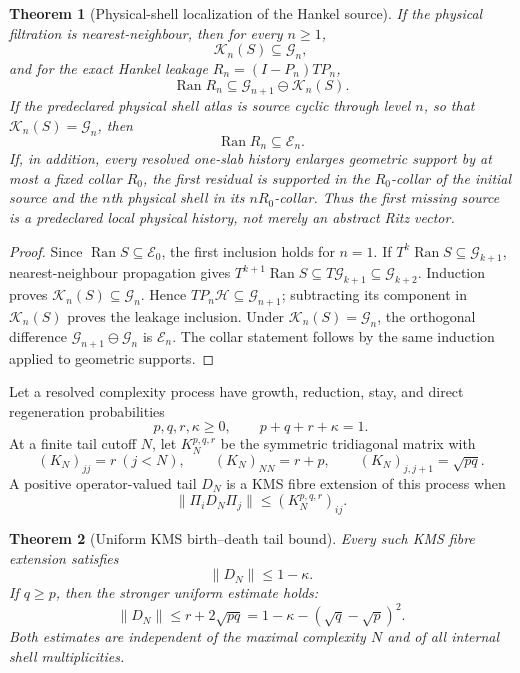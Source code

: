 \documentclass[11pt]{article}
\newtheorem{theorem}{Theorem}[section]
\theoremstyle{definition}
\theoremstyle{remark}
\newcommand{\norm}[1]{\lVert#1\rVert}
\newcommand{\Ran}{\operatorname{Ran}}
\begin{document}
\begin{theorem}[Physical-shell localization of the Hankel source]
\label{thm:YM-physical-shell-master}
If the physical filtration is nearest-neighbour, then for every $n\ge1$,
\[
 \boxed{\mathcal K_n(S)\subseteq\mathcal G_n,}
\]
and for the exact Hankel leakage $R_n=(I-P_n)TP_n$,
\[
 \boxed{\Ran R_n\subseteq
 \mathcal G_{n+1}\ominus\mathcal K_n(S).}
\]
If the predeclared physical shell atlas is source cyclic through level $n$,
so that $\mathcal K_n(S)=\mathcal G_n$, then
\[
 \boxed{\Ran R_n\subseteq\mathcal E_n.}
\]
If, in addition, every resolved one-slab history enlarges geometric support by
at most a fixed collar $R_0$, the first residual is supported in the
$R_0$-collar of the initial source and the $n$th physical shell in its
$nR_0$-collar.  Thus the first missing source is a predeclared local physical
history, not merely an abstract Ritz vector.
\end{theorem}

\begin{proof}
Since $\Ran S\subseteq\mathcal E_0$, the first inclusion holds for $n=1$.
If $T^k\Ran S\subseteq\mathcal G_{k+1}$, nearest-neighbour propagation gives
$T^{k+1}\Ran S\subseteq T\mathcal G_{k+1}\subseteq\mathcal G_{k+2}$.
Induction proves $\mathcal K_n(S)\subseteq\mathcal G_n$.  Hence
$TP_n\mathcal H\subseteq\mathcal G_{n+1}$; subtracting its component in
$\mathcal K_n(S)$ proves the leakage inclusion.  Under
$\mathcal K_n(S)=\mathcal G_n$, the orthogonal difference
$\mathcal G_{n+1}\ominus\mathcal G_n$ is $\mathcal E_n$.  The collar statement
follows by the same induction applied to geometric supports.
\end{proof}

Let a resolved complexity process have growth, reduction, stay, and direct
regeneration probabilities
\[
 p,q,r,\kappa\ge0,
 \qquad p+q+r+\kappa=1.
\]
At a finite tail cutoff $N$, let $K_N^{p,q,r}$ be the symmetric tridiagonal
matrix with
\[
 (K_N)_{jj}=r\ (j<N),
 \qquad (K_N)_{NN}=r+p,
 \qquad (K_N)_{j,j+1}=\sqrt{pq}.
\]
A positive operator-valued tail $D_N$ is a KMS fibre extension of this process
when
\[
 \norm{\Pi_iD_N\Pi_j}\le (K_N^{p,q,r})_{ij}.
\]

\begin{theorem}[Uniform KMS birth--death tail bound]
\label{thm:YM-birth-death-tail-master}
Every such KMS fibre extension satisfies
\[
 \boxed{\norm{D_N}\le1-\kappa.}
\]
If $q\ge p$, then the stronger uniform estimate holds:
\[
 \boxed{
 \norm{D_N}\le r+2\sqrt{pq}
 =1-\kappa-(\sqrt q-\sqrt p)^2.}
\]
Both estimates are independent of the maximal complexity $N$ and of all
internal shell multiplicities.
\end{theorem}
\end{document}
